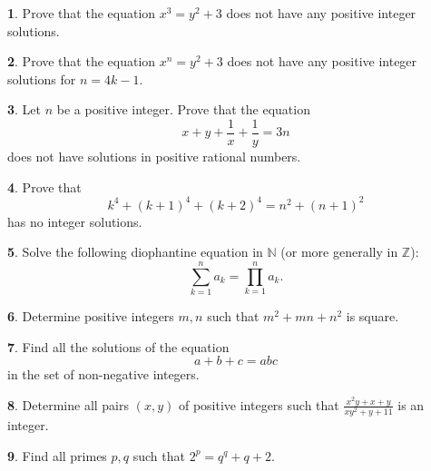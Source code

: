 \documentclass{article}
\theoremstyle{definition}
\newtheorem{p}{}
\begin{document}
	
	
	\begin{p}
		Prove that the equation $x^3=y^2+3$ does not have any positive integer solutions.
	\end{p}
	
	
	
	
	\begin{p}
		Prove that the equation $x^n=y^2+3$ does not have any positive integer solutions for $n=4k-1$.
		
	\end{p}
	
	
	
	
	\begin{p}
		Let $n$ be a positive integer. Prove that the equation  
		\[x+y+\frac{1}{x}+\frac{1}{y}=3n\]
		does not have solutions in positive rational numbers.
	\end{p}
	
	
	
	
	\begin{p}
		Prove that
		\[ k^4+(k+1)^4+(k+2)^4=n^2+(n+1)^2 \]
		has no integer solutions.
	\end{p}
	
	
	
	
	
	\begin{p}
		Solve the following diophantine equation in $\mathbb{N}$ (or more generally in $\mathbb{Z}$):
		\[\sum_{k=1}^{n}{a_{k}}=\prod_{k=1}^{n}{a_{k}}.\]
	\end{p}
	
	
	
	
	
	\begin{p}
		Determine positive integers $m,n$ such that $m^2+mn+n^2$ is square.
	\end{p}
	
	
	
	
	
	\begin{p}
		Find all the solutions of the equation \[a+b+c=abc\] in the set of non-negative integers.
	\end{p}
	
	
	
	
	\begin{p}
		Determine all pairs $(x,y)$ of positive integers such that $\frac{x^{2}y+x+y}{xy^{2}+y+11}$ is an integer.
	\end{p}
	
	
	
	
	\begin{p}
		Find all primes $p,q$ such that $2^{p}=q^{q}+q+2$.
	\end{p}
	
\end{document}
